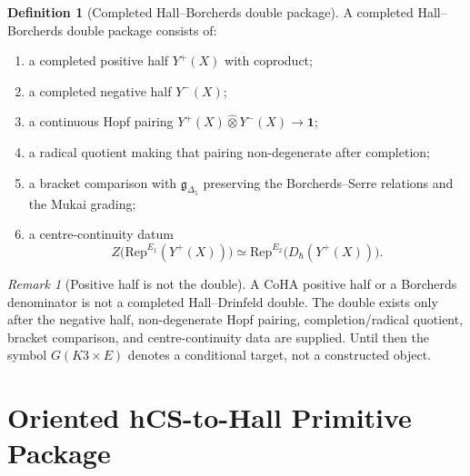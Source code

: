 \documentclass[11pt]{amsart}
\theoremstyle{plain}
\theoremstyle{definition}
\newtheorem{definition}[theorem]{Definition}
\theoremstyle{remark}
\newtheorem{remark}[theorem]{Remark}
\providecommand{\Gdelta}{\mathfrak g_{\Delta_{5}}}
\providecommand{\widehatotimes}{\widehat\otimes}
\providecommand{\Rep}{\mathrm{Rep}}
\begin{document}
\begin{definition}[Completed Hall--Borcherds double package]
\label{def:double-package}
A completed Hall--Borcherds double package consists of:
\begin{enumerate}[label=\textup{(D\arabic*)},leftmargin=2.5em]
\item a completed positive half $Y^+(X)$ with coproduct;
\item a completed negative half $Y^-(X)$;
\item a continuous Hopf pairing
$Y^+(X)\widehatotimes Y^-(X)\to\mathbf 1$;
\item a radical quotient making that pairing non-degenerate after
completion;
\item a bracket comparison with $\Gdelta$ preserving the Borcherds--Serre
relations and the Mukai grading;
\item a centre-continuity datum
\[
 Z\bigl(\Rep^{E_1}(Y^+(X))\bigr)
 \simeq
 \Rep^{E_2}\bigl(D_\hbar(Y^+(X))\bigr).
\]
\end{enumerate}
\end{definition}

\begin{remark}[Positive half is not the double]
\label{rem:positive-half-not-double}
A CoHA positive half or a Borcherds denominator is not a completed
Hall--Drinfeld double.  The double exists only after the negative half,
non-degenerate Hopf pairing, completion/radical quotient, bracket
comparison, and centre-continuity data are supplied.  Until then the
symbol $G(K3\times E)$ denotes a conditional target, not a constructed
object.
\end{remark}

\section{Oriented hCS-to-Hall Primitive Package}
\label{sec:hcs-hall-package}
\end{document}
